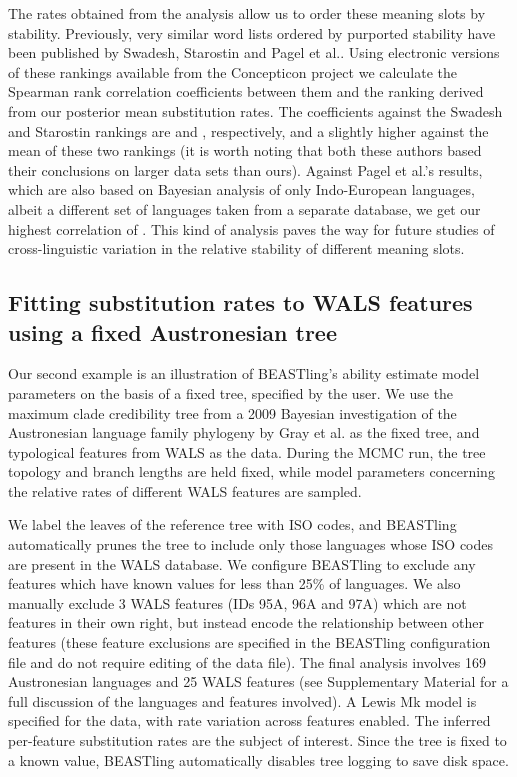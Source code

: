 \documentclass[10pt,a4paper]{article}
\begin{document}
The rates obtained from the analysis allow us to order these meaning slots by stability.  Previously, very similar word lists ordered by purported stability have been published by Swadesh\cite{Swadesh1955}, Starostin\cite{Starostin2007} and Pagel et al.\cite{Pagel2007}.  Using electronic versions of these rankings available from the Concepticon project\cite{List2015} we calculate the Spearman rank correlation coefficients between them and the ranking derived from our posterior mean substitution rates. The coefficients against the Swadesh and Starostin rankings are \unskip and \unskip, respectively, and a slightly higher \unskip against the mean of these two rankings (it is worth noting that both these authors based their conclusions on larger data sets than ours).  Against Pagel et al.'s results, which are also based on Bayesian analysis of only Indo-European languages, albeit a different set of languages taken from a separate database, we get our highest correlation of \unskip.  This kind of analysis paves the way for future studies of cross-linguistic variation in the relative stability of different meaning slots.

\subsection{Fitting substitution rates to WALS features using a fixed Austronesian tree}

Our second example is an illustration of BEASTling's ability estimate model parameters on the basis of a fixed tree, specified by the user.  We use the maximum clade credibility tree from a 2009 Bayesian investigation of the Austronesian language family phylogeny by Gray et al.\cite{Gray2009} as the fixed tree, and typological features from WALS \cite{Dryer2013} as the data.  During the MCMC run, the tree topology and branch lengths are held fixed, while model parameters concerning the relative rates of different WALS features are sampled.

We label the leaves of the reference tree with ISO codes, and BEASTling automatically prunes the tree to include only those languages whose ISO codes are present in the WALS database.  We configure BEASTling to exclude any features which have known values for less than 25\% of languages.  We also manually exclude 3 WALS features (IDs 95A, 96A and 97A) which are not features in their own right, but instead encode the relationship between other features (these feature exclusions are specified in the BEASTling configuration file and do not require editing of the data file).  The final analysis involves 169 Austronesian languages and 25 WALS features (see Supplementary Material for a full discussion of the languages and features involved).  A Lewis Mk model is specified for the data, with rate variation across features enabled.  The inferred per-feature substitution rates are the subject of interest.  Since the tree is fixed to a known value, BEASTling automatically disables tree logging to save disk space.
\end{document}
